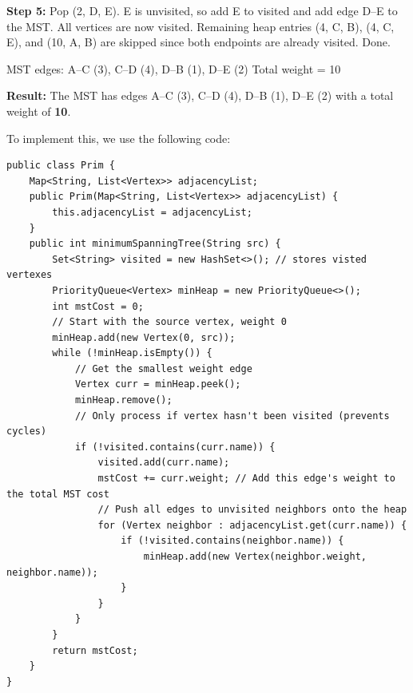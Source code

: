 \textbf{Step 5:} Pop (2, D, E). E is unvisited, so add E to visited and add edge D--E to the MST. All vertices are now visited. Remaining heap entries (4, C, B), (4, C, E), and (10, A, B) are skipped since both endpoints are already visited. Done.

\begin{center}

{\small MST edges: A--C (3), C--D (4), D--B (1), D--E (2) \quad Total weight = 10}
\end{center}

\textbf{Result:} The MST has edges A--C (3), C--D (4), D--B (1), D--E (2) with a total weight of \textbf{10}.

To implement this, we use the following code:


\begin{verbatim}
public class Prim {
    Map<String, List<Vertex>> adjacencyList;
    public Prim(Map<String, List<Vertex>> adjacencyList) {
        this.adjacencyList = adjacencyList;
    }
    public int minimumSpanningTree(String src) {
        Set<String> visited = new HashSet<>(); // stores visted vertexes
        PriorityQueue<Vertex> minHeap = new PriorityQueue<>();
        int mstCost = 0;
        // Start with the source vertex, weight 0
        minHeap.add(new Vertex(0, src));
        while (!minHeap.isEmpty()) {
            // Get the smallest weight edge
            Vertex curr = minHeap.peek();
            minHeap.remove();
            // Only process if vertex hasn't been visited (prevents cycles)
            if (!visited.contains(curr.name)) {
                visited.add(curr.name);
                mstCost += curr.weight; // Add this edge's weight to the total MST cost
                // Push all edges to unvisited neighbors onto the heap
                for (Vertex neighbor : adjacencyList.get(curr.name)) {
                    if (!visited.contains(neighbor.name)) {
                        minHeap.add(new Vertex(neighbor.weight, neighbor.name));
                    }
                }
            }
        }
        return mstCost;
    }
}
\end{verbatim}

